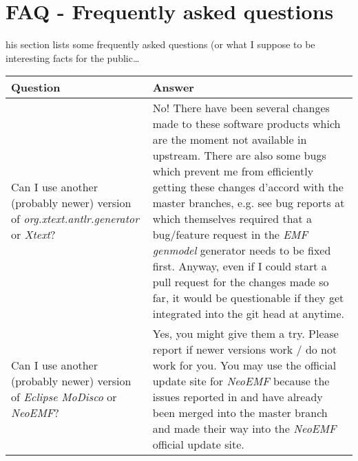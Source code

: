 \section{FAQ - Frequently asked questions}
his section lists some frequently asked questions
(or what I suppose to be interesting facts for the public\dots

\begin{center}
\begin{tabular}{|p{5cm}|p{10cm}|}\hline
Question & Answer \\ \hline
Can I use another (probably newer) version of 
{\it org.xtext.antlr.generator} or
{\it Xtext}? 
& No! There have been several changes made to these
software products which are the moment not available
in upstream. There are also some bugs which prevent
me from efficiently getting these changes d'accord
with the master branches, e.g. see bug reports at
\cite{Xtext_bug_1} \cite{Xtext_bug_2} which
themselves required that a bug/feature request
in the {\it EMF genmodel}
generator\cite{EMF_bug_1} needs to be
fixed first.
Anyway, even if I could start a pull request for
the changes made so far, it would be questionable
if they get integrated into the git head at anytime.
\\     \hline
Can I use another (probably newer) version of 
{\it Eclipse MoDisco} or {\it NeoEMF}?
& Yes, you might give them a try. Please
report if newer versions work / do not work for you.
You may use the official update site for 
{\it NeoEMF} because the issues reported in 
\cite{NeoEMF_issue_7}
and \cite{NeoEMF_issue_8} have already been merged
into the master branch and made their way into the 
{\it NeoEMF} official update site.
\\    \hline
\end{tabular}
\end{center}

